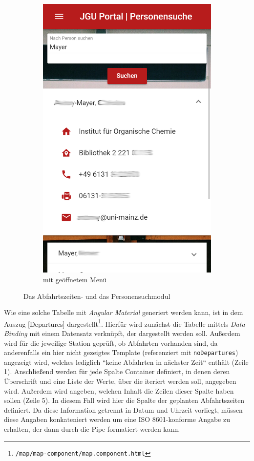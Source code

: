 \begin{figure}
\begin{subfigure}{.5\textwidth}
  \includegraphics[width=.8\linewidth]{gfx/Personen}
  \caption{mit geöffnetem Menü}
  \label{fig:persons}
\end{subfigure}
\caption{Das Abfahrtszeiten- und das Personensuchmodul}
\label{fig:busStops+Persons}
\end{figure}
Wie eine solche Tabelle mit \textit{Angular Material} generiert werden kann, ist in dem Auszug \ref{Departures} dargestellt\footnote{\texttt{/map/map-component/map.component.html}}. Hierfür wird zunächst die Tabelle mittels \textit{Data-Binding} mit einem Datensatz verknüpft, der dargestellt werden soll. Außerdem wird für die jeweilige Station geprüft, ob Abfahrten vorhanden sind, da anderenfalls ein hier nicht gezeigtes Template (referenziert mit \texttt{noDepartures}) angezeigt wird, welches lediglich ``keine Abfahrten in nächster Zeit`` enthält (Zeile 1). Anschließend werden für jede Spalte Container definiert, in denen deren Überschrift und eine Liste der Werte, über die iteriert werden soll, angegeben wird. Außerdem wird angeben, welchen Inhalt die Zeilen dieser Spalte haben sollen (Zeile 5). In diesem Fall wird hier die Spalte der geplanten Abfahrtszeiten definiert. Da diese Information getrennt in Datum und Uhrzeit vorliegt, müssen diese Angaben konkateniert werden um eine ISO 8601-konforme Angabe zu erhalten, der dann durch die Pipe formatiert werden kann.

